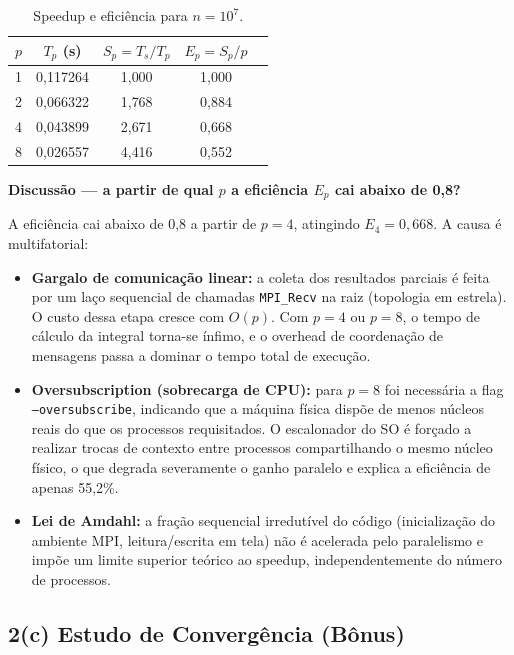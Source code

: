 \documentclass[12pt,a4paper]{article}
\begin{document}
\begin{table}[h!]
\centering
\begin{tabular}{@{}ccccc@{}}
\toprule
$p$ & $T_p$ (s) & $S_p = T_s/T_p$ & $E_p = S_p/p$ \\
\midrule
1 & 0{,}117264 & 1{,}000 & 1{,}000 \\
2 & 0{,}066322 & 1{,}768 & 0{,}884 \\
4 & 0{,}043899 & 2{,}671 & 0{,}668 \\
8 & 0{,}026557 & 4{,}416 & 0{,}552 \\
\bottomrule
\end{tabular}
\caption{Speedup e eficiência para $n=10^7$.}
\end{table}

\textbf{Discussão — a partir de qual $p$ a eficiência $E_p$ cai abaixo de 0,8?}

A eficiência cai abaixo de 0,8 a partir de $p=4$, atingindo $E_4 = 0{,}668$. A causa é multifatorial:

\begin{itemize}
  \item \textbf{Gargalo de comunicação linear:} a coleta dos resultados parciais é feita por um laço sequencial de chamadas \texttt{MPI\_Recv} na raiz (topologia em estrela). O custo dessa etapa cresce com $O(p)$. Com $p=4$ ou $p=8$, o tempo de cálculo da integral torna-se ínfimo, e o overhead de coordenação de mensagens passa a dominar o tempo total de execução.

  \item \textbf{Oversubscription (sobrecarga de CPU):} para $p=8$ foi necessária a flag \texttt{--oversubscribe}, indicando que a máquina física dispõe de menos núcleos reais do que os processos requisitados. O escalonador do SO é forçado a realizar trocas de contexto entre processos compartilhando o mesmo núcleo físico, o que degrada severamente o ganho paralelo e explica a eficiência de apenas 55{,}2\%.

  \item \textbf{Lei de Amdahl:} a fração sequencial irredutível do código (inicialização do ambiente MPI, leitura/escrita em tela) não é acelerada pelo paralelismo e impõe um limite superior teórico ao speedup, independentemente do número de processos.
\end{itemize}

\subsection{2(c) Estudo de Convergência (Bônus)}
\end{document}
